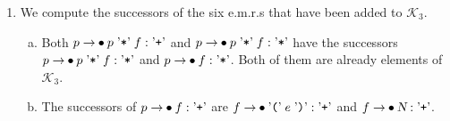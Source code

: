 \begin{enumerate}
\begin{enumerate}[(a)]
            $p \rightarrow \mdot p \aquoted{*} f: \saquoted{+}$ and $p \rightarrow \mdot f: \saquoted{+}$.
      \item In the e.m.r.\@ $p \rightarrow \mdot p \aquoted{*} f: \symbol{36}$, the variable $p$ is followed by the
            token $\saquoted{*}$.  Hence, its successors are $p \rightarrow \mdot p \aquoted{*} f: \saquoted{*}$ and
            $p \rightarrow \mdot f: \saquoted{*}$.
      \item The successors of $p \rightarrow \mdot f: \symbol{36}$ are
            $f \rightarrow \mdot \saquoted{(}\; e \;\saquoted{)}: \symbol{36}$ and
            $f \rightarrow \mdot \textsl{N}: \symbol{36}$.
      \end{enumerate}
      Therefore, we have
      \\[0.2cm]
      \hspace*{1.3cm}
      $\begin{array}[t]{lcl}
         \mathcal{K}_3 & = & \mathcal{K}_2 \cup \bigl\{ p \rightarrow \mdot p \aquoted{*} f: \saquoted{+},\;
                                                        p \rightarrow \mdot f: \saquoted{+},\;
                                                        p \rightarrow \mdot p \aquoted{*} f: \saquoted{*},\;
                                                        p \rightarrow \mdot f: \saquoted{*}, \\[0.1cm]
                       &   & \hphantom{\mathcal{K}_2 \cup \bigl\{}
                                                        f \rightarrow \mdot \saquoted{(}\; e \;\saquoted{)}: \symbol{36},\;
                                                        f \rightarrow \mdot \textsl{N}: \symbol{36} \bigr\}.
       \end{array}$
\item We compute the successors of the six e.m.r.s that have been added to $\mathcal{K}_3$.
      \begin{enumerate}[(a)]
      \item Both $p \rightarrow \mdot p \aquoted{*} f: \saquoted{+}$ and
            $p \rightarrow \mdot p \aquoted{*} f: \saquoted{*}$ have the successors
            $p \rightarrow \mdot p \aquoted{*} f: \saquoted{*}$ and $p \rightarrow \mdot f: \saquoted{*}$.  Both of
            them are already elements of $\mathcal{K}_3$.
      \item The successors of $p \rightarrow \mdot f: \saquoted{+}$ are
            $f \rightarrow \mdot \saquoted{(}\; e \;\saquoted{)}: \saquoted{+}$ and
            $f \rightarrow \mdot \textsl{N}: \saquoted{+}$.

\end{enumerate}
\end{enumerate}
